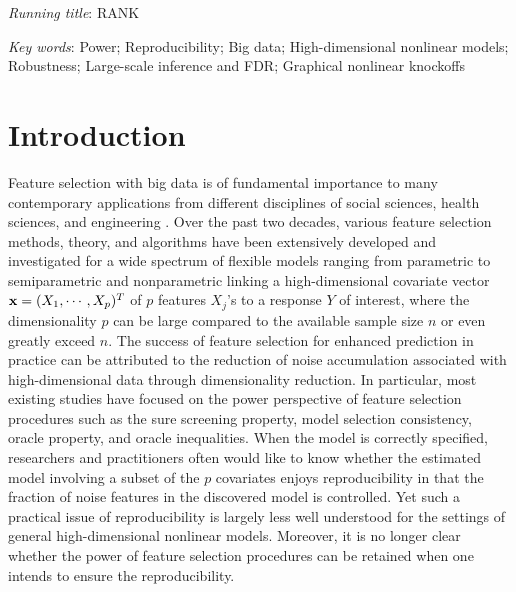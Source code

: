 \documentclass[11pt]{article}
\newcommand{\bx}{\mbox{\bf x}}
\def\t{^T}
\begin{document}
\textit{Running title}: RANK

\textit{Key words}: Power; Reproducibility; Big data; High-dimensional nonlinear models; Robustness; Large-scale inference and FDR; Graphical nonlinear knockoffs


\section{Introduction} \label{sec:Intro}

Feature selection with big data is of fundamental importance to many contemporary applications from different disciplines of social sciences, health sciences, and engineering \cite{HastieTibshiraniFriedman2009, FanLv2010, BuhlmannvandeGeer2011}. Over the past two decades, various feature selection methods, theory, and algorithms have been extensively developed and investigated for a wide spectrum of flexible models ranging from parametric to semiparametric and nonparametric linking a high-dimensional covariate vector $\bx = (X_1, \cdots, X_p)\t$ of $p$ features $X_j$'s to a response $Y$ of interest, where the dimensionality $p$ can be large compared to the available sample size $n$ or even greatly exceed $n$. The success of feature selection for enhanced prediction in practice can be attributed to the reduction of noise accumulation associated with high-dimensional data through dimensionality reduction. In particular, most existing studies have focused on the power perspective of feature selection procedures such as the sure screening property, model selection consistency, oracle property, and oracle inequalities. When the model is correctly specified, researchers and practitioners often would like to know whether the estimated model involving a subset of the $p$ covariates enjoys reproducibility in that the fraction of noise features in the discovered model is controlled. Yet such a practical issue of reproducibility is largely less well understood for the settings of general high-dimensional nonlinear models. Moreover, it is no longer clear whether the power of feature selection procedures can be retained when one intends to ensure the reproducibility.
\end{document}
